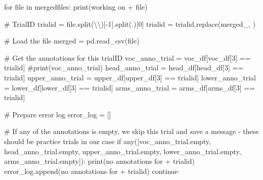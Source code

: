 \documentclass[
  letterpaper,
  DIV=11,
  numbers=noendperiod]{scrreprt}
\newenvironment{Shaded}{\begin{snugshade}}{\end{snugshade}}
\newcommand{\BuiltInTok}[1]{\textcolor[rgb]{0.00,0.23,0.31}{#1}}
\newcommand{\CharTok}[1]{\textcolor[rgb]{0.13,0.47,0.30}{#1}}
\newcommand{\CommentTok}[1]{\textcolor[rgb]{0.37,0.37,0.37}{#1}}
\newcommand{\ControlFlowTok}[1]{\textcolor[rgb]{0.00,0.23,0.31}{#1}}
\newcommand{\DecValTok}[1]{\textcolor[rgb]{0.68,0.00,0.00}{#1}}
\newcommand{\KeywordTok}[1]{\textcolor[rgb]{0.00,0.23,0.31}{#1}}
\newcommand{\NormalTok}[1]{\textcolor[rgb]{0.00,0.23,0.31}{#1}}
\newcommand{\OperatorTok}[1]{\textcolor[rgb]{0.37,0.37,0.37}{#1}}
\newcommand{\StringTok}[1]{\textcolor[rgb]{0.13,0.47,0.30}{#1}}
\begin{document}
\begin{Shaded}
\begin{Highlighting}[]
\ControlFlowTok{for} \BuiltInTok{file} \KeywordTok{in}\NormalTok{ mergedfiles:}
    \BuiltInTok{print}\NormalTok{(}\StringTok{\textquotesingle{}working on \textquotesingle{}} \OperatorTok{+} \BuiltInTok{file}\NormalTok{)}

    \CommentTok{\# TrialID}
\NormalTok{    trialid }\OperatorTok{=} \BuiltInTok{file}\NormalTok{.split(}\StringTok{\textquotesingle{}}\CharTok{\textbackslash{}\textbackslash{}}\StringTok{\textquotesingle{}}\NormalTok{)[}\OperatorTok{{-}}\DecValTok{1}\NormalTok{].split(}\StringTok{\textquotesingle{}.\textquotesingle{}}\NormalTok{)[}\DecValTok{0}\NormalTok{]}
\NormalTok{    trialid }\OperatorTok{=}\NormalTok{ trialid.replace(}\StringTok{\textquotesingle{}merged\_\textquotesingle{}}\NormalTok{, }\StringTok{\textquotesingle{}\textquotesingle{}}\NormalTok{)}
    
    \CommentTok{\# Load the file}
\NormalTok{    merged }\OperatorTok{=}\NormalTok{ pd.read\_csv(}\BuiltInTok{file}\NormalTok{)}

    \CommentTok{\# Get the annotations for this trialID}
\NormalTok{    voc\_anno\_trial }\OperatorTok{=}\NormalTok{ voc\_df[voc\_df[}\DecValTok{3}\NormalTok{] }\OperatorTok{==}\NormalTok{ trialid]}
    \CommentTok{\#print(voc\_anno\_trial)}
\NormalTok{    head\_anno\_trial }\OperatorTok{=}\NormalTok{ head\_df[head\_df[}\DecValTok{3}\NormalTok{] }\OperatorTok{==}\NormalTok{ trialid]}
\NormalTok{    upper\_anno\_trial }\OperatorTok{=}\NormalTok{ upper\_df[upper\_df[}\DecValTok{3}\NormalTok{] }\OperatorTok{==}\NormalTok{ trialid]}
\NormalTok{    lower\_anno\_trial }\OperatorTok{=}\NormalTok{ lower\_df[lower\_df[}\DecValTok{3}\NormalTok{] }\OperatorTok{==}\NormalTok{ trialid]}
\NormalTok{    arms\_anno\_trial }\OperatorTok{=}\NormalTok{ arms\_df[arms\_df[}\DecValTok{3}\NormalTok{] }\OperatorTok{==}\NormalTok{ trialid]}

    \CommentTok{\# Prepare error log}
\NormalTok{    error\_log }\OperatorTok{=}\NormalTok{ []}

    \CommentTok{\# If any of the annotations is empty, we skip this trial and save a message {-} these should be practice trials in our case}
    \ControlFlowTok{if} \BuiltInTok{any}\NormalTok{([voc\_anno\_trial.empty, head\_anno\_trial.empty, upper\_anno\_trial.empty, lower\_anno\_trial.empty, arms\_anno\_trial.empty]):}
        \BuiltInTok{print}\NormalTok{(}\StringTok{\textquotesingle{}no annotations for \textquotesingle{}} \OperatorTok{+}\NormalTok{ trialid)}
\NormalTok{        error\_log.append(}\StringTok{\textquotesingle{}no annotations for \textquotesingle{}} \OperatorTok{+}\NormalTok{ trialid)}
        \ControlFlowTok{continue}


\end{Highlighting}
\end{Shaded}
\end{document}
